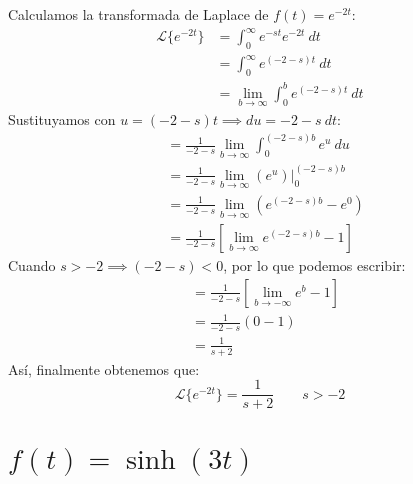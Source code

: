 \documentclass[12pt, a4paper]{article}
\begin{document}
Calculamos la transformada de Laplace de \(f(t) = e^{-2t}\):
\begin{align*}
	\mathcal{L}\{e^{-2t}\} &= \int_{0}^{\infty} e^{-st} e^{-2t}\ dt \\
	&= \int_{0}^{\infty} e^{(-2-s)t} \ dt \\
	&= \lim_{b \to \infty} \int_{0}^{b} e^{(-2-s)t} \ dt
\end{align*}
Sustituyamos con \(u = (-2-s) t \implies du = -2-s\ dt\):
\begin{align*}
	&= \frac{1}{-2-s} \lim_{b \to \infty} \int_{0}^{(-2-s)b} e^{u} \ du \\
	&= \frac{1}{-2-s} \lim_{b \to \infty} \left. \left( e^{u} \right)  \right|_{0}^{(-2-s)b} \\
	&= \frac{1}{-2-s} \lim_{b \to \infty} \left( e^{(-2-s)b} - e^{0} \right) \\
	&= \frac{1}{-2-s} \left[ \lim_{b \to \infty} e^{(-2-s)b} - 1 \right]
\end{align*}
Cuando \(s > -2 \implies (-2-s) < 0\), por lo que podemos escribir:
\begin{align*}
	&= \frac{1}{-2-s} \left[ \lim_{b \to -\infty} e^{b} - 1 \right] \\
	&= \frac{1}{-2-s} (0 - 1) \\
	&= \frac{1}{s+2}
\end{align*}
Así, finalmente obtenemos que:
\[
	\mathcal{L}\{e^{-2t}\} = \frac{1}{s+2} \qquad s > -2
\]

\setcounter{section}{13}
\section{\texorpdfstring{\(f(t)=\sinh(3t)\)}{f (t) = sinh (3t)}}
\end{document}
